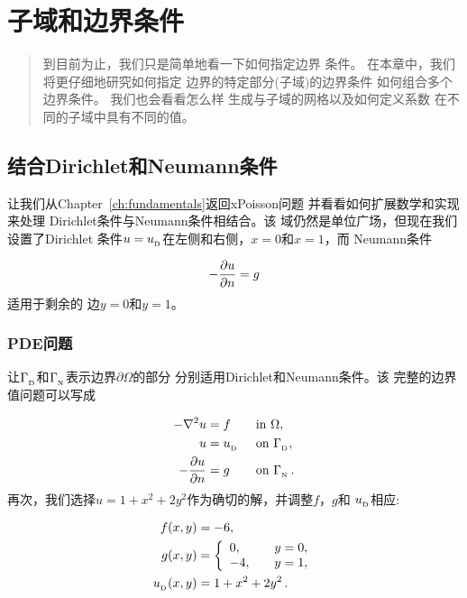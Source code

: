 \chapter{子域和边界条件}
\label{ch:subdomains}



\begin{quote}
到目前为止，我们只是简单地看一下如何指定边界
条件。 在本章中，我们将更仔细地研究如何指定
边界的特定部分(子域)的边界条件
如何组合多个边界条件。 我们也会看看怎么样
生成与子域的网格以及如何定义系数
在不同的子域中具有不同的值。
\end{quote}


\section{结合Dirichlet和Neumann条件}
\label{ch:poisson0:DN}

让我们从Chapter~\ref{ch:fundamentals}返回xPoisson问题
并看看如何扩展数学和实现来处理
Dirichlet条件与Neumann条件相结合。该
域仍然是单位广场，但现在我们设置了Dirichlet
条件$u=u_{_\mathrm{D}}$在左侧和右侧，$x=0$和$x=1$，而
Neumann条件

\begin{equation*}
-{\partial u\over\partial n}=g
\end{equation*}
适用于剩余的
边$y=0$和$y=1$。


\subsection{PDE问题}

让$\Gamma_{_\mathrm{D}}$和$\Gamma_{_\mathrm{N}}$表示边界$\partial\Omega$的部分
分别适用Dirichlet和Neumann条件。该
完整的边界值问题可以写成

\begin{alignat}{2}
    - \nabla^2 u &= f \quad&&\mbox{in } \Omega,  \\
    u &= u_{_\mathrm{D}} &&\mbox{on } \Gamma_{_\mathrm{D}},       \\
    - {\partial u\over\partial n} &= g &&\mbox{on } \Gamma_{_\mathrm{N}}  \thinspace .
\end{alignat}
再次，我们选择$u=1+x^2 + 2y^2$作为确切的解，并调整$f$，$g$和
$u_{_\mathrm{D}}$相应:

\begin{align*}
f(x, y) &= -6,\\
g(x, y) &= \left\lbrace\begin{array}{ll}
0, & \quad y=0,\\
-4, & \quad y=1,
\end{array}\right.\\
u_{_\mathrm{D}}(x, y) &= 1 + x^2 + 2y^2\thinspace .
\end{align*}

